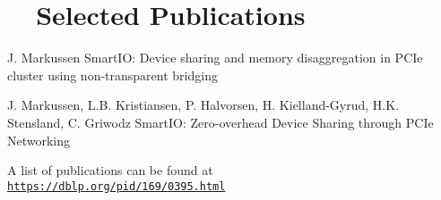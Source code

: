 \section[Selected Publications]{\faBook[regular]~~Selected Publications}
    {J. Markussen}
    {SmartIO: Device sharing and memory disaggregation in PCIe cluster using non-transparent bridging}

    {J. Markussen, L.B. Kristiansen, P. Halvorsen, H. Kielland-Gyrud, H.K. Stensland, C. Griwodz}
    {SmartIO: Zero-overhead Device Sharing through PCIe Networking}

%	
%
%
A list of publications can be found at\\
\texttt{\href{https://dblp.org/pid/169/0395.html}{https://dblp.org/pid/169/0395.html}}
